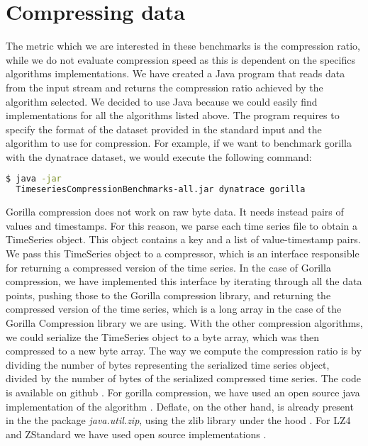 \section{Compressing data}
The metric which we are interested in these benchmarks is the compression ratio, while we do not evaluate compression speed
as this is dependent on the specifics algorithms implementations.
We have created a Java program that reads data from the input stream and returns the compression ratio
achieved by the algorithm selected. We decided to use Java because we could easily find implementations for
all the algorithms listed above.
The program requires to specify the format of the dataset provided in the standard input and the
algorithm to use for compression. For example, if we want to benchmark gorilla with the dynatrace dataset,
we would execute the following command:
\lstset{
    basicstyle=\small,
    stringstyle=\ttfamily
}
\begin{lstlisting}[language=bash]
  $ java -jar
  TimeseriesCompressionBenchmarks-all.jar dynatrace gorilla
\end{lstlisting}
Gorilla compression does not work on raw byte data. It needs instead pairs of values and timestamps.
For this reason, we parse each time series file to obtain a TimeSeries object.
This object contains a key and a list of value-timestamp pairs.  
We pass this TimeSeries object to a compressor, which is an interface responsible for returning a compressed version of the time series.
In the case of Gorilla compression, we have implemented this interface by iterating through all
the data points, pushing those to the Gorilla compression library, and returning the compressed
version of the time series, which is a long array in the case of the Gorilla Compression library we are using.
With the other compression algorithms, we could serialize the TimeSeries
object to a byte array, which was then compressed to a new byte array. 
The way we compute the compression ratio is by dividing the number of bytes representing the serialized
time series object, divided by the number of bytes of the serialized compressed time series.
The code is available on github \cite{dovidio_2019_dovidiotscompressionthesis}.
For gorilla compression, we have used an open source java implementation of the algorithm
\cite{burmanm_2018_burmanmgorillatsc}. Deflate, on the other hand, is already present in the the package
\textit{java.util.zip}, using the zlib library under the hood \cite{a2019_deflater}.
For LZ4 and ZStandard we have used open source implementations \cite{lz4_2019_lz4lz4java}\cite{luben_2015_lubenzstdjni}.

